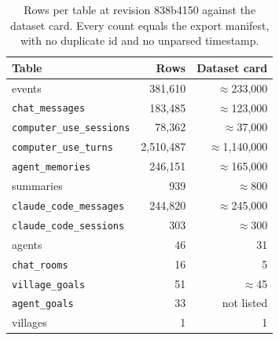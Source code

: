 \documentclass{arxivtmpl}
\begin{document}
\begin{table}[htbp]
\centering
\small
\caption{Rows per table at revision 838b4150 against the dataset card. Every count equals the export manifest, with no duplicate id and no unparsed timestamp.}
\begin{tabular}{lrr}
\toprule
Table & Rows & Dataset card \\
\midrule
events & 381,610 & $\approx$233,000 \\
\texttt{chat\_messages} & 183,485 & $\approx$123,000 \\
\texttt{computer\_use\_sessions} & 78,362 & $\approx$37,000 \\
\texttt{computer\_use\_turns} & 2,510,487 & $\approx$1,140,000 \\
\texttt{agent\_memories} & 246,151 & $\approx$165,000 \\
summaries & 939 & $\approx$800 \\
\texttt{claude\_code\_messages} & 244,820 & $\approx$245,000 \\
\texttt{claude\_code\_sessions} & 303 & $\approx$300 \\
agents & 46 & 31 \\
\texttt{chat\_rooms} & 16 & 5 \\
\texttt{village\_goals} & 51 & $\approx$45 \\
\texttt{agent\_goals} & 33 & not listed \\
villages & 1 & 1 \\
\bottomrule
\end{tabular}
\end{table}

\begin{table}[htbp]
\centering
\small
\caption{Serial intervals by generation on determined paths, where every acquisition from the root had a single candidate parent. Medians are forward serial intervals, and p comes from 499 permutations. The type I error is the rejection rate on 100 synthetic null replicates, and the power the rejection rate on 25 replicates with 1.5-fold growth per generation.}
\end{table}
\end{document}
